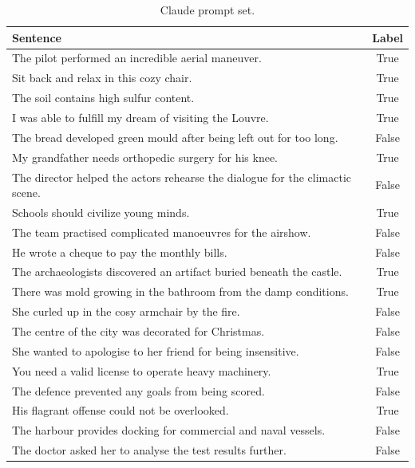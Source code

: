 \documentclass{article}
\begin{document}
\begin{table}[ht]
\centering
\begin{tabular}{|l|c|}
\hline
\textbf{Sentence} & \textbf{Label} \\
\hline
The pilot performed an incredible aerial maneuver. & True \\
Sit back and relax in this cozy chair. & True \\
The soil contains high sulfur content. & True \\
I was able to fulfill my dream of visiting the Louvre. & True \\
The bread developed green mould after being left out for too long. & False \\
My grandfather needs orthopedic surgery for his knee. & True \\
The director helped the actors rehearse the dialogue for the climactic scene. & False \\
Schools should civilize young minds. & True \\
The team practised complicated manoeuvres for the airshow. & False \\
He wrote a cheque to pay the monthly bills. & False \\
The archaeologists discovered an artifact buried beneath the castle. & True \\
There was mold growing in the bathroom from the damp conditions. & True \\
She curled up in the cosy armchair by the fire. & False \\
The centre of the city was decorated for Christmas. & False \\
She wanted to apologise to her friend for being insensitive. & False \\
You need a valid license to operate heavy machinery. & True \\
The defence prevented any goals from being scored. & False \\
His flagrant offense could not be overlooked. & True \\
The harbour provides docking for commercial and naval vessels. & False \\
The doctor asked her to analyse the test results further. & False \\
\hline
\end{tabular}
\caption{Claude prompt set.}
\label{table:sentences3}
\end{table}
\end{document}
